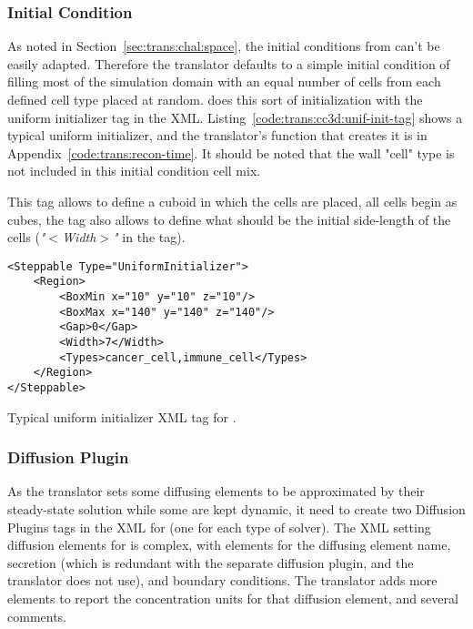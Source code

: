 \subsubsection{Initial Condition}\label{sec:trans:gen:xml:init}

As noted in Section~\ref{sec:trans:chal:space}, the initial conditions from \pscs can't be easily adapted. Therefore the translator defaults to a simple initial condition of filling most of the simulation domain with an equal number of cells from each defined cell type placed at random. \ccds does this sort of initialization with the uniform initializer tag in the XML. Listing~\ref{code:trans:cc3d:unif-init-tag} shows a typical uniform initializer, and the translator's function that creates it is in Appendix~\ref{code:trans:recon-time}. It should be noted that the wall "cell" type is not included in this initial condition cell mix.

This tag allows to define a cuboid in which the cells are placed, all cells begin as cubes, the tag also allows to define what should be the initial side-length of the cells (\textit{"$<$Width$>$"} in the tag).
\begin{listing}[H]%
\begin{verbatim}
<Steppable Type="UniformInitializer">
	<Region>
		<BoxMin x="10" y="10" z="10"/>
		<BoxMax x="140" y="140" z="140"/>
		<Gap>0</Gap>
		<Width>7</Width>
		<Types>cancer_cell,immune_cell</Types>
	</Region>
</Steppable>
\end{verbatim}
\caption{Typical uniform initializer XML tag for \ccd.}\label{code:trans:cc3d:unif-init-tag}
\end{listing}

\subsubsection{Diffusion Plugin}\label{sec:trans:gen:xml:diff}
As the translator sets some diffusing elements to be approximated by their steady-state solution while some are kept dynamic, it need to create two Diffusion Plugins tags in the XML for \ccds (one for each type of solver). The XML setting diffusion elements for \ccds is complex, with elements for the diffusing element name, secretion (which is redundant with the separate diffusion plugin, and the translator does not use), and boundary conditions. The translator adds more elements to report the concentration units for that diffusion element, and several comments. 


